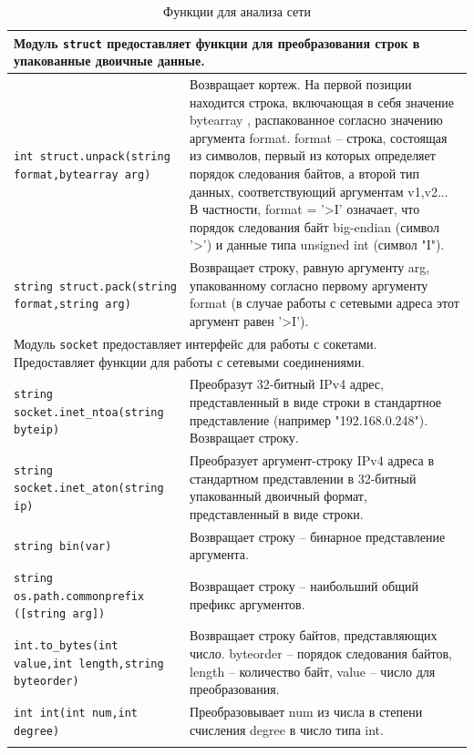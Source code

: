 \documentclass[a4paper]{article}
\begin{document}
\begin{center}
\begin{longtable}{|p{6cm}|p{10cm}|}
\hline
\multicolumn{2}{|p{15cm}|}{Модуль \texttt{struct} предоставляет функции для преобразования строк в упакованные двоичные данные.}\\
\hline
\texttt{int struct.unpack(string format,bytearray arg)}&Возвращает кортеж. На первой позиции находится строка, включающая в себя значение bytearray , распакованное согласно значению аргумента format. format -- строка, состоящая из символов, первый из которых определяет порядок следования байтов, а второй тип данных, соответствующий аргументам v1,v2... В частности, format = '>I' означает, что порядок следования байт big-endian (символ '>') и данные типа unsigned int (символ "I").\\
\hline
\texttt{string struct.pack(string format,string arg)}&Возвращает строку, равную аргументу arg, упакованному согласно первому аргументу format (в случае работы с сетевыми адреса этот аргумент равен '>I').\\
\hline
\multicolumn{2}{|p{15cm}|}{Модуль \texttt{socket} предоставляет интерфейс для работы с сокетами. Предоставляет функции для работы с сетевыми соединениями.}\\
\hline
\texttt{string socket.inet\_ntoa(string byteip)}&Преобразут 32-битный IPv4 адрес, представленный в виде строки в стандартное представление (например "192.168.0.248"). Возвращает строку.\\
\hline
\texttt{string socket.inet\_aton(string ip)}&Преобразует аргумент-строку IPv4 адреса в стандартном представлении в 32-битный упакованный двоичный формат, представленный в виде строки.\\
\hline
\texttt{string bin(var)}&Возвращает строку -- бинарное представление аргумента.\\
\hline
\texttt{string os.path.commonprefix ([string arg])}&Возвращает строку -- наибольший общий префикс аргументов.\\
\hline
\texttt{int.to\_bytes(int value,int length,string byteorder)}&Возвращает строку байтов, представляющих число. byteorder -- порядок следования байтов, length -- количество байт, value -- число для преобразования.\\
\hline
\texttt{int int(int num,int degree)}&Преобразовывает num из числа в степени счисления degree в число типа int.\\
\hline
\caption{Функции для анализа сети}
\end{longtable}
\end{center}
\end{document}
